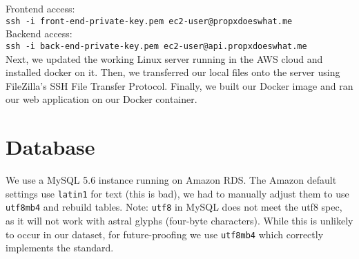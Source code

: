 \documentclass[12pt]{article}
\newcommand{\code}[1]{\texttt{#1}}
\begin{document}
Frontend access: \\
\code{ssh -i front-end-private-key.pem ec2-user@propxdoeswhat.me} \\
Backend access: \\
\code{ssh -i back-end-private-key.pem ec2-user@api.propxdoeswhat.me} \\

Next, we updated the working Linux server running in the AWS cloud and installed docker on it. Then, we transferred our local files onto the server using FileZilla's SSH File Transfer Protocol. Finally, we built our Docker image and ran our web application on our Docker container.

\section{Database}

We use a MySQL 5.6 instance running on Amazon RDS. The Amazon default settings use \code{latin1} for text (this is bad), we had to manually adjust them to use \code{utf8mb4} and rebuild tables. Note: \code{utf8} in MySQL does not meet the utf8 spec, as it will not work with astral glyphs (four-byte characters). While this is unlikely to occur in our dataset, for future-proofing we use \code{utf8mb4} which correctly implements the standard. 
\end{document}
